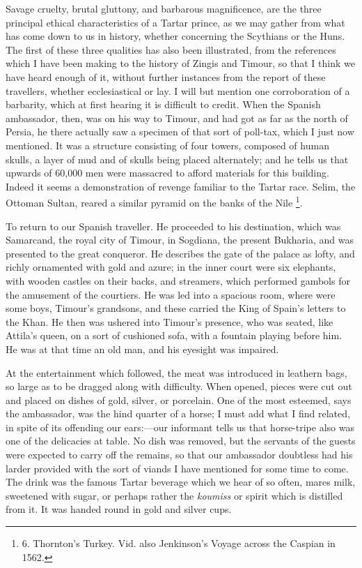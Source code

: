 Savage cruelty, brutal
gluttony, and barbarous magnificence, are the three principal
ethical characteristics of a Tartar prince, as we may gather from what
has come down to us in history, whether concerning the Scythians or
the Huns. The first of these three qualities has also been
illustrated, from the references which I have been making to the
history of Zingis and Timour, so that I think we have heard enough of
it, without further instances from the report of these travellers,
whether ecclesiastical or lay. I will but mention one corroboration of
a barbarity, which at first hearing it is difficult to credit. When
the Spanish ambassador, then, was on his way to Timour, and had got as
far as the north of Persia, he there actually saw a specimen of that
sort of poll-tax, which I just now mentioned. It was a structure
consisting of four towers, composed of human skulls, a layer of mud
and of skulls being placed alternately; and he tells us that upwards
of 60,000 men were massacred to afford materials for this building.
Indeed it seems a demonstration of revenge familiar to the Tartar
race. Selim, the Ottoman Sultan, reared a similar pyramid on the banks
of the Nile \footnote{6.
Thornton's Turkey. Vid. also Jenkinson's Voyage across the Caspian in
1562.}.

To return to our Spanish
traveller. He proceeded to his destination, which was Samarcand, the
royal city of Timour, in Sogdiana, the present Bukharia, and was
presented to the great conqueror. He describes the gate of the palace
as lofty, and richly ornamented with gold and azure; in the inner
court were six elephants, with wooden castles on their backs, and
streamers, which performed gambols for the amusement of the courtiers.
He was led into a spacious room, where were some boys, Timour's
grandsons, and these carried the King of Spain's letters to the Khan.
He then was ushered into Timour's presence, who was seated, like
Attila's queen, on a sort of cushioned sofa, with a fountain playing
before him. He was at that time an old man, and his eyesight was
impaired.

At the entertainment which
followed, the meat was introduced in leathern bags, so large as to be
dragged along with difficulty. When opened, pieces were cut out and
placed on dishes of gold, silver, or porcelain. One of the most
esteemed, says the ambassador, was the hind quarter of a horse; I must
add what I find related, in spite of its offending our ears:—our
informant tells us that horse-tripe also was one of the delicacies at
table. No dish was removed, but the servants of the guests were
expected to carry off the remains, so that our ambassador doubtless
had his larder provided with the sort of viands I have mentioned for
some time to come. The drink was the famous Tartar beverage which we
hear of so often, mares milk, sweetened with sugar, or perhaps rather
the \emph{koumiss} or spirit which is distilled from it. It was handed
round in gold and silver cups.

